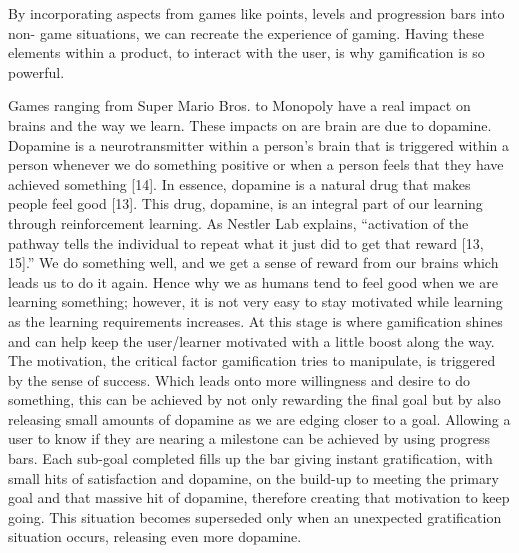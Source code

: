 \documentclass{sigchi}
\begin{document}
By incorporating aspects from games like points, levels and progression bars into non- game situations, we can recreate the experience of gaming. Having these elements within a product, to interact with the user, is why gamification is so powerful. 

Games ranging from Super Mario Bros. to Monopoly have a real impact on brains and the way we learn. These impacts on are brain are due to dopamine. Dopamine is a neurotransmitter within a person’s brain that is triggered within a person whenever we do something positive or when a person feels that they have achieved something [14]. In essence, dopamine is a natural drug that makes people feel good [13]. This drug, dopamine, is an integral part of our learning through reinforcement learning. As Nestler Lab explains, “activation of the pathway tells the individual to repeat what it just did to get that reward [13, 15].” We do something well, and we get a sense of reward from our brains which leads us to do it again. Hence why we as humans tend to feel good when we are learning something; however, it is not very easy to stay motivated while learning as the learning requirements increases. At this stage is where gamification shines and can help keep the user/learner motivated with a little boost along the way. The motivation, the critical factor gamification tries to manipulate, is triggered by the sense of success. Which leads onto more willingness and desire to do something, this can be achieved by not only rewarding the final goal but by also releasing small amounts of dopamine as we are edging closer to a goal. Allowing a user to know if they are nearing a milestone can be achieved by using progress bars. Each sub-goal completed fills up the bar giving instant gratification, with small hits of satisfaction and dopamine, on the build-up to meeting the primary goal and that massive hit of dopamine, therefore creating that motivation to keep going. This situation becomes superseded only when an unexpected gratification situation occurs, releasing even more dopamine. 
\end{document}
